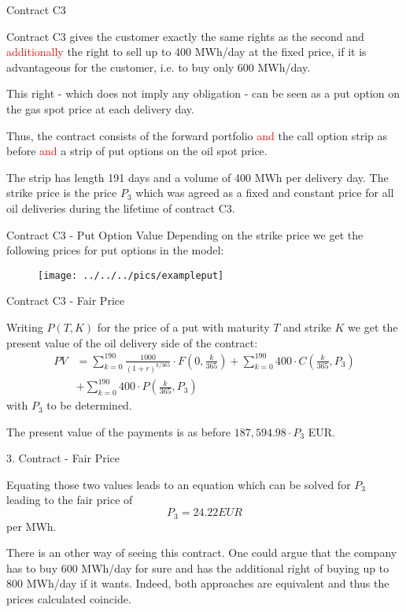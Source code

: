 
{Contract C3}
\item<1-> Contract C3 gives the customer exactly the same rights as the second and \textcolor{red}{additionally} the right to sell up to 400 MWh/day at the fixed price, if it is advantageous for the customer, i.e. to buy only 600 MWh/day.
\item<2-> This right - which does not imply any obligation - can be seen as a put option on the gas spot price at each delivery day.
\item<3-> Thus, the contract consists of the forward portfolio \textcolor{red}{and} the call option strip as before \textcolor{red}{and} a strip of put options on the oil spot price.
\item<4-> The strip has length 191 days and a volume of 400 MWh per delivery day. The strike price is the price $P_3$ which was agreed as a fixed and constant price for all oil deliveries during the lifetime of contract C3.

{Contract C3  - Put Option Value}
Depending on the strike price we get the following prices for put options in the model:
\begin{figure}
	\centering
		\texttt{[image: ../../../pics/exampleput]}
	\label{fig:exampleput}
\end{figure}

{Contract C3 - Fair Price}
\item<1-> Writing $P(T,K)$ for the price of a put with maturity $T$ and strike $K$ we get the present value of the oil delivery side of the contract:
\begin{align*}
	PV &= \sum_{k=0}^{190} \frac{1000}{(1+r)^{k/365}} \cdot F(0,\frac k {365}) + \sum_{k=0}^{190} 400 \cdot C(\frac k {365},P_3)\\
	 &+ \sum_{k=0}^{190} 400 \cdot P(\frac k {365},P_3)
\end{align*}
with $P_3$ to be determined.
\item<2-> The present value of the payments is as before $187,594.98 \cdot P_3$ EUR.

{3. Contract - Fair Price}
\item<1-> Equating those two values leads to an equation which can be solved for $P_3$ leading to the fair price of
$$
	P_3 = 24.22 EUR
$$
per MWh.
\item<2->
There is an other way of seeing this contract. One could argue that the company has to buy 600 MWh/day for sure and has the additional right of buying up to 800 MWh/day if it wants. Indeed, both approaches are equivalent and thus the prices calculated coincide.

